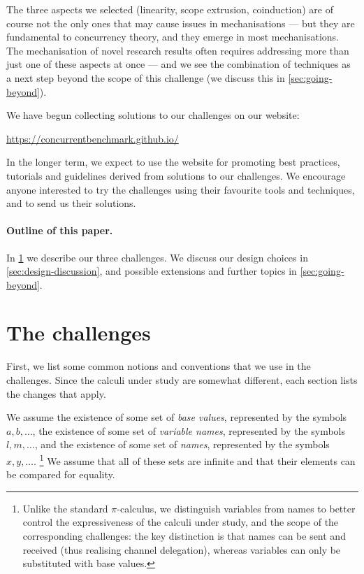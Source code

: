 \documentclass[runningheads]{llncs}
\begin{document}
The three aspects we selected (linearity, scope extrusion, coinduction) are of
course not the only ones that may cause issues in mechanisations --- but they
are fundamental to concurrency theory, and they emerge in most mechanisations.
The mechanisation of novel research results often requires addressing more than
just one of these aspects at once --- and we see the combination of techniques
as a next step beyond the scope of this challenge (we discuss this in
\cref{sec:going-beyond}).


We have begun collecting solutions to our challenges on our website:
%
\begin{center}
  \url{https://concurrentbenchmark.github.io/}
\end{center}
%
In the longer term, we expect to use the website for promoting best practices,
tutorials and guidelines derived from solutions to our challenges.
We encourage anyone interested to try the challenges using their
favourite tools and techniques, and to send us their solutions.

\paragraph{Outline of this paper.}
In \cref{sec:challenge-problems} we describe our three challenges.
We discuss our design choices in \cref{sec:design-discussion}, and possible extensions and further topics in \cref{sec:going-beyond}.

\section{The challenges}\label{sec:challenge-problems}
\label{sec:prelim}
First, we list some common notions and conventions that we use in the
challenges. Since the calculi under study are somewhat different, each section
lists the changes that apply.

We assume the existence of some set of \emph{base values}, represented by the symbols
\( a, b, \dots \), the existence of some set
of \emph{variable names}, represented by the symbols
\( l, m, \dots \), and the existence of some set of \emph{names},
represented by the symbols \( x, y, \dots \).%
\footnote{%
  Unlike the standard $\pi$-calculus, we distinguish variables from names to
  better control the expressiveness of the calculi under study, and the scope of
  the corresponding challenges: the key distinction is that names can be sent
  and received (thus realising channel delegation), whereas variables can only
  be substituted with base values.%
} %
%
We assume that all of these sets are infinite and that their elements can be
compared for equality.
\end{document}
